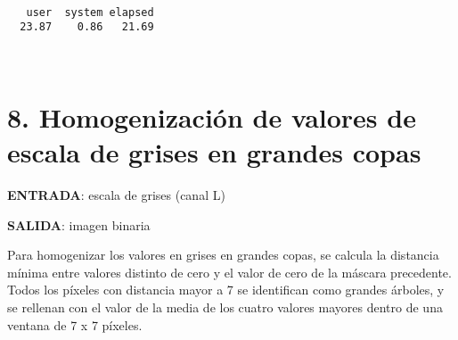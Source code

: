 \documentclass[11pt]{article}
\makeatletter
\newcommand{\boxspacing}{\kern\kvtcb@left@rule\kern\kvtcb@boxsep}
\newcommand{\prompt}[4]{
        \ttfamily\llap{{\color{#2}[#3]:\hspace{3pt}#4}}\vspace{-\baselineskip}
    }
\makeatother
\begin{document}
    \begin{center}
    \end{center}
    { \hspace*{\fill} \\}
    
    \begin{center}
    \end{center}
    { \hspace*{\fill} \\}
    
    \begin{center}
    \end{center}
    { \hspace*{\fill} \\}
    
    
    \begin{verbatim}
   user  system elapsed 
  23.87    0.86   21.69 
    \end{verbatim}

    
    \begin{center}
    \end{center}
    { \hspace*{\fill} \\}
    
    \hypertarget{homogenizaciuxf3n-de-valores-de-escala-de-grises-en-grandes-copas}{%
\section{8. Homogenización de valores de escala de grises en grandes
copas}\label{homogenizaciuxf3n-de-valores-de-escala-de-grises-en-grandes-copas}}

\textbf{ENTRADA}: escala de grises (canal L)

\textbf{SALIDA}: imagen binaria

Para homogenizar los valores en grises en grandes copas, se calcula la
distancia mínima entre valores distinto de cero y el valor de cero de la
máscara precedente. Todos los píxeles con distancia mayor a 7 se
identifican como grandes árboles, y se rellenan con el valor de la media
de los cuatro valores mayores dentro de una ventana de 7 x 7 píxeles.

    \begin{tcolorbox}[breakable, size=fbox, boxrule=1pt, pad at break*=1mm,colback=cellbackground, colframe=cellborder]
\prompt{In}{incolor}{ }{\boxspacing}
\begin{Verbatim}[commandchars=\\\{\}]

\end{Verbatim}
\end{tcolorbox}
\end{document}
